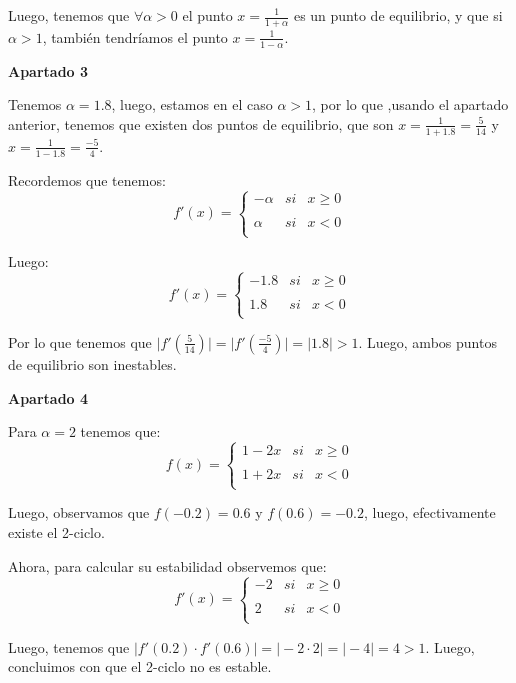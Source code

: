 \documentclass[a4paper, 12pt]{article}
\theoremstyle{plain}
\theoremstyle{definition}
\theoremstyle{remark}
\begin{document}
	Luego, tenemos que $\forall \alpha>0$ el punto $x=\frac{1}{1+\alpha}$ es un punto de equilibrio, y que si $\alpha > 1$, también tendríamos el punto $x=\frac{1}{1-\alpha}$.
	
	\bigskip
	\textbf{Apartado 3}
	
	Tenemos $\alpha=1.8$, luego, estamos en el caso $\alpha > 1$, por lo que ,usando el apartado anterior, tenemos que existen dos puntos de equilibrio, que son $x=\frac{1}{1+1.8}=\frac{5}{14}$ y $x=\frac{1}{1-1.8}=\frac{-5}{4}$.
	
	\medskip
	Recordemos que tenemos: 
	\[f'(x)= \left\{ \begin{array}{lcc}
	-\alpha &   si  & x \geq 0 \\
	\\\alpha &  si & x < 0 \\
	\end{array}
	\right.\]
	
	Luego:
	\[f'(x)= \left\{ \begin{array}{lcc}
	-1.8 &   si  & x \geq 0 \\
	\\1.8 &  si & x < 0 \\
	\end{array}
	\right.\]
	
	\medskip
	Por lo que tenemos que $\mid f'(\frac{5}{14}) \mid = \mid f'(\frac{-5}{4}) \mid = \mid 1.8 \mid > 1$. Luego, ambos puntos de equilibrio son inestables.
	
	\bigskip
	\textbf{Apartado 4}
	
	Para $\alpha= 2$ tenemos que:
	\[f(x)= \left\{ \begin{array}{lcc}
	1-2 x &   si  & x \geq 0 \\
	\\ 1+2 x &  si & x < 0 \\
	\end{array}
	\right.\]
	
	\medskip
	Luego, observamos que $f(-0.2) = 0.6$ y $f(0.6) = -0.2$, luego, efectivamente existe el 2-ciclo.
	
	Ahora, para calcular su estabilidad observemos que:
	\[f'(x)= \left\{ \begin{array}{lcc}
	-2 &   si  & x \geq 0 \\
	\\2 &  si & x < 0 \\
	\end{array}
	\right.\]
	
	\medskip
	Luego, tenemos que $\mid f'(0.2)\cdot f'(0.6) \mid= \mid -2\cdot 2\mid = \mid -4 \mid = 4 > 1 $. Luego, concluimos con que el 2-ciclo no es estable.
	
\end{document}
